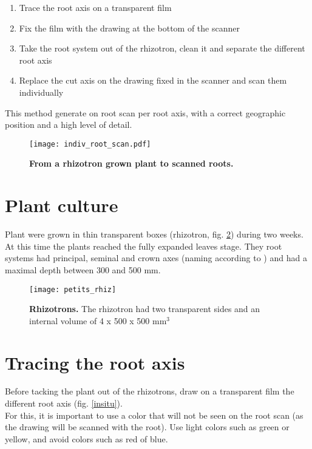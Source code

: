 \documentclass[a4paper,english,10pt]{report}
\begin{document}
\begin{enumerate}
\item Trace the root axis on a transparent film
\item Fix the film with the drawing at the bottom of the scanner
\item Take the root system out of the rhizotron, clean it and separate the different root axis
\item Replace the cut axis on the drawing fixed in the scanner and scan them individually
\end{enumerate}

This method generate on root scan per root axis, with a correct geographic position and a high level of detail.

\begin{figure}[h!]
\begin{center}
\texttt{[image: indiv\_root\_scan.pdf]}
\caption[From a rhizotron grown plant to scanned roots]{\textbf{From a rhizotron grown plant to scanned roots.}}
\label{indiv_root_scan}
\end{center}
\end{figure}

\section{Plant culture}

Plant were grown in thin transparent boxes (rhizotron, fig. \ref{rhizotron}) during two weeks. At this time the plants reached the  fully expanded leaves stage. They root systems had principal, seminal and crown axes (naming according to \cite{Hochholdinger04}) and had a maximal depth between 300 and 500 mm.


\begin{figure}[h]
\centering
\texttt{[image: petits\_rhiz]}
\caption[Rhizotron]{\textbf{Rhizotrons.} The rhizotron had two transparent sides and an internal volume of 4 x 500 x 500 mm$^3$}
\label{rhizotron}
\end{figure}

\section{Tracing the root axis}

Before tacking the plant out of the rhizotrons, draw on a transparent film the different root axis (fig. \ref{insitu}). \\

For this, it is important to use a color that will not be seen on the root scan (as the drawing will be scanned with the root). Use light colors such as green or yellow, and avoid colors such as red of blue.\\
\end{document}
